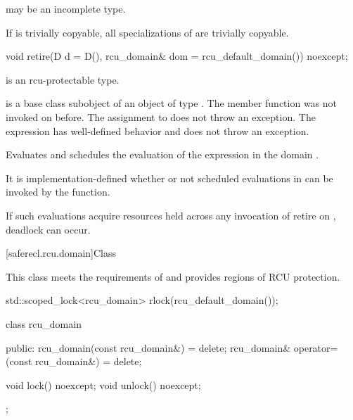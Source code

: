 \pnum
{} may be an incomplete type.

\pnum
If  is trivially copyable, all specializations of
 are trivially copyable.

\begin{itemdecl}
void retire(D d = D(), rcu_domain& dom = rcu_default_domain()) noexcept;
\end{itemdecl}

\begin{itemdescr}

\pnum
\mandates
{} is an rcu-protectable type.

\pnum
\expects
{} is a base class subobject of
an object  of type . The member function
 was not invoked on 
before. The assignment to  does not throw an
exception. The expression  has
well-defined behavior and does not throw an exception.

\pnum
\effects
Evaluates  and schedules
the evaluation of the expression  in the domain .

\pnum
\remarks
It is implementation-defined whether or not scheduled
evaluations in  can be invoked by the 
function.
\begin{note}
If such evaluations acquire resources held across any invocation of
retire on , deadlock can occur.
\end{note}

\end{itemdescr}

[saferecl.rcu.domain]{Class }


This class meets the requirements of   and provides regions of RCU protection.

\begin{example}
\begin{codeblock}
std::scoped_lock<rcu_domain> rlock(rcu_default_domain());
\end{codeblock}
\end{example}

\begin{codeblock}
class rcu_domain {
public:
  rcu_domain(const rcu_domain&) = delete;
  rcu_domain& operator=(const rcu_domain&) = delete;

  void lock() noexcept;
  void unlock() noexcept;
};
\end{codeblock}

